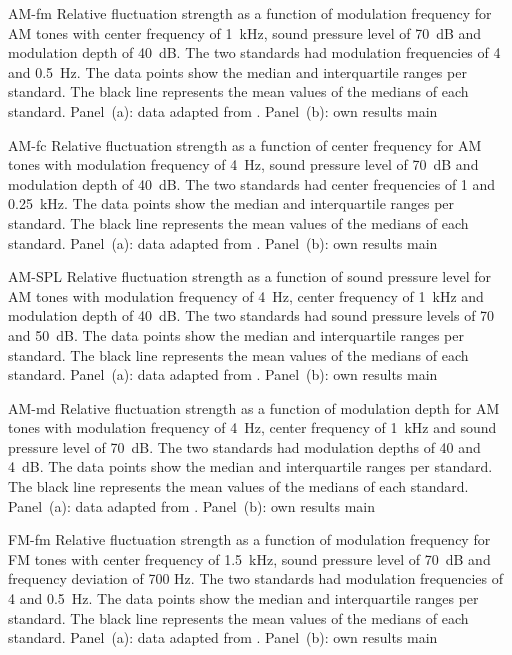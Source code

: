 \documentclass[../../main.tex]{subfiles}
\begin{document}
\begin{experimentalresults}

\myfigurefastlexpstds%
  {AM-fm}
  {Relative fluctuation strength as a function of modulation frequency for
    \gls{AM} tones with center frequency of 1~kHz, sound pressure level of
    70~dB and modulation depth of 40~dB.  The two standards had modulation
    frequencies of 4 and 0.5~Hz. The data points show the median and
    interquartile ranges per standard. The black line represents the mean values
    of the medians of each standard. Panel~(a): data adapted from
    \cite[pp.248]{Fastl2007Psychoacoustics}. Panel~(b): own results}
  {main}

\myfigurefastlexpstds%
  {AM-fc}
  {Relative fluctuation strength as a function of center frequency for
    \gls{AM} tones with modulation frequency of 4~Hz, sound pressure level of
    70~dB and modulation depth of 40~dB.  The two standards had center
    frequencies of 1 and 0.25~kHz. The data points show the median and
    interquartile ranges per standard. The black line represents the mean values
    of the medians of each standard. Panel~(a): data adapted from
    \cite[pp.250]{Fastl2007Psychoacoustics}. Panel~(b): own results}
  {main}

\myfigurefastlexpstds%
  {AM-SPL}
  {Relative fluctuation strength as a function of sound pressure level for
    \gls{AM} tones with modulation frequency of 4~Hz, center frequency of 1~kHz
    and modulation depth of 40~dB.  The two standards had sound pressure levels
    of 70 and 50~dB. The data points show the median and
    interquartile ranges per standard. The black line represents the mean values
    of the medians of each standard. Panel~(a): data adapted from
    \cite[pp.249]{Fastl2007Psychoacoustics}. Panel~(b): own results}
  {main}

\myfigurefastlexpstds%
  {AM-md}
  {Relative fluctuation strength as a function of modulation depth for
    \gls{AM} tones with modulation frequency of 4~Hz, center frequency of 1~kHz
    and sound pressure level of 70~dB.  The two standards had modulation depths
    of 40 and 4~dB. The data points show the median and
    interquartile ranges per standard. The black line represents the mean values
    of the medians of each standard. Panel~(a): data adapted from
    \cite[pp.249]{Fastl2007Psychoacoustics}. Panel~(b): own results}
  {main}

\myfigurefastlexpstds%
  {FM-fm}
  {Relative fluctuation strength as a function of modulation frequency for
    \gls{FM} tones with center frequency of 1.5~kHz, sound pressure level of
    70~dB and frequency deviation of 700 Hz.  The two standards had modulation
    frequencies of 4 and 0.5~Hz. The data points show the median and
    interquartile ranges per standard. The black line represents the mean values
    of the medians of each standard. Panel~(a): data adapted from
    \cite[pp.248]{Fastl2007Psychoacoustics}. Panel~(b): own results}
  {main}


\end{experimentalresults}
\end{document}

